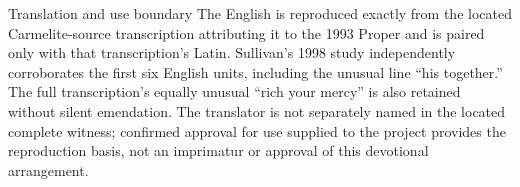 \begin{studybox}{Translation and use boundary}
The English is reproduced exactly from the located Carmelite-source transcription attributing it to the 1993 Proper and is paired only with that transcription's Latin. Sullivan's 1998 study independently corroborates the first six English units, including the unusual line ``his together.'' The full transcription's equally unusual ``rich your mercy'' is also retained without silent emendation. The translator is not separately named in the located complete witness; confirmed approval for use supplied to the project provides the reproduction basis, not an imprimatur or approval of this devotional arrangement.
\end{studybox}


